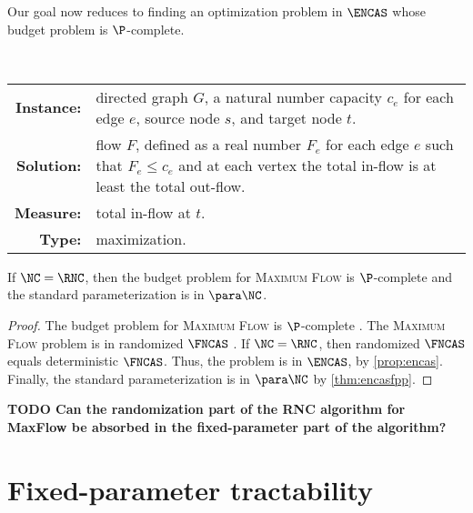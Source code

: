 \documentclass{article}
\newcommand{\todo}[1]{\textbf{TODO #1}}
\begin{document}
Our goal now reduces to finding an optimization problem in $\ENCAS$ whose budget problem is $\P$-complete.

\begin{definition}
  \mbox{} \\
  \begin{tabular}{r p{9.2cm}}
    \textbf{Instance:} & directed graph $G$, a natural number capacity $c_e$ for each edge $e$, source node $s$, and target node $t$. \\
    \textbf{Solution:} & flow $F$, defined as a real number $F_e$ for each edge $e$ such that $F_e \leq c_e$ and at each vertex the total in-flow is at least the total out-flow. \\
    \textbf{Measure:} & total in-flow at $t$. \\
    \textbf{Type:} & maximization.
  \end{tabular}
\end{definition}


\begin{theorem}
  If $\NC = \RNC$, then the budget problem for \textsc{Maximum Flow} is $\P$-complete and the standard parameterization is in $\para \NC$.
\end{theorem}
\begin{proof}
  The budget problem for \textsc{Maximum Flow} is $\P$-complete \autocite[Problem~A.4.4]{ghr95}.
  The \textsc{Maximum Flow} problem is in randomized $\FNCAS$ \autocite[Theorem~4.5.2]{dsst97}.
  If $\NC = \RNC$, then randomized $\FNCAS$ equals deterministic $\FNCAS$.
  Thus, the problem is in $\ENCAS$, by \autoref{prop:encas}.
  Finally, the standard parameterization is in $\para \NC$ by \autoref{thm:encasfpp}.
\end{proof}

\todo{Can the randomization part of the RNC algorithm for MaxFlow be absorbed in the fixed-parameter part of the algorithm?}


\section{Fixed-parameter tractability}
\end{document}
